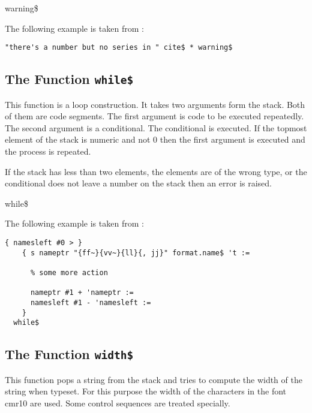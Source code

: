 \begin{BstFunction}{warning\$}
\end{BstFunction}

The following example is taken from :

\begin{lstlisting}[language=bst]
  "there's a number but no series in " cite$ * warning$ 
\end{lstlisting}%


\subsection{The Function \texttt{while\$}}%

This function is a loop construction. It takes two arguments form the
stack. Both of them are code segments. The first argument is code to
be executed repeatedly. The second argument is a conditional. The
conditional is executed. If the topmost element of the stack is
numeric and not 0 then the first argument is executed and the process
is repeated.

If the stack has less than two elements, the elements are of the
wrong type, or the conditional does not leave a number on the stack
then an error is raised.

\begin{BstFunction}{while\$}
\end{BstFunction}

The following example is taken from :

\begin{lstlisting}[language=bst]
    { namesleft #0 > }
    { s nameptr "{ff~}{vv~}{ll}{, jj}" format.name$ 't :=

      % some more action

      nameptr #1 + 'nameptr :=
      namesleft #1 - 'namesleft :=
    }
  while$
\end{lstlisting}%
\fctIndex{+}\fctIndex{-}\fctIndex{>}%
\fctIndex{:=}


\subsection{The Function \texttt{width\$}}%

This function pops a string from the stack and tries to compute the
width of the string when typeset. For this purpose the width of the
characters in the font cmr10 are used. Some control sequences are
treated specially.

